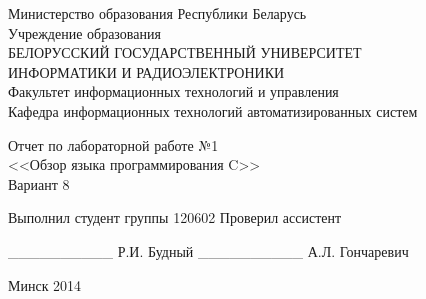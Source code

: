 
\thispagestyle{empty}
\setlength{\parindent}{0ex} %

\begin{center}
  Министерство образования Республики Беларусь \\
  \smallskip
  Учреждение образования \\
  БЕЛОРУССКИЙ ГОСУДАРСТВЕННЫЙ УНИВЕРСИТЕТ \\
  ИНФОРМАТИКИ И РАДИОЭЛЕКТРОНИКИ \\
  \smallskip
  Факультет информационных технологий и управления \\
  \smallskip
  Кафедра информационных технологий автоматизированных систем
\end{center}

\vspace{50mm}

\begin{center}
  Отчет по лабораторной работе №1 \\
  <<Обзор языка программирования C>> \\
  Вариант 8
\end{center}

\vspace{45mm}

\begin{minipage}{.55\linewidth}
  Выполнил студент группы 120602
  \smallskip
  Проверил ассистент
\end{minipage}
\hfill
\begin{minipage}{.4\linewidth}
  \begin{flushright}
    \_\_\_\_\_\_\_\_\_\_ Р.И. Будный
    \smallskip
    \_\_\_\_\_\_\_\_\_\_ А.Л. Гончаревич
  \end{flushright}
\end{minipage}

\vspace{60mm}
\begin{center}
  Минск 2014
\end{center}

\setlength{\parindent}{5ex} %